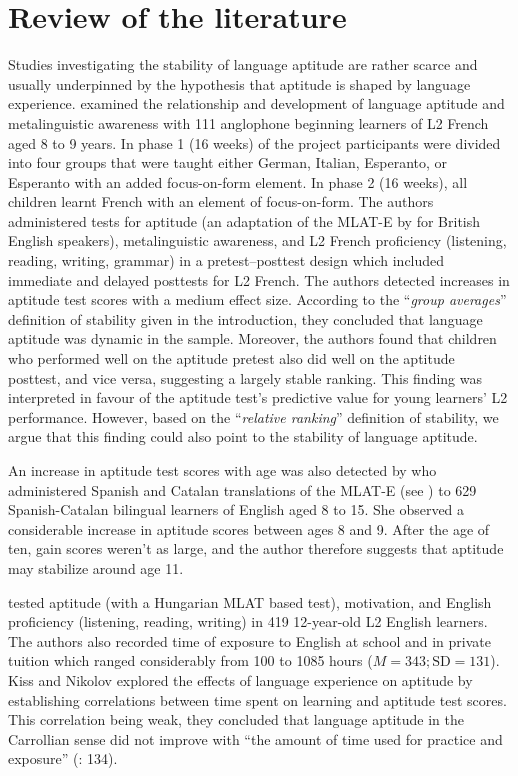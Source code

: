 \documentclass[output=paper]{langsci/langscibook}
\begin{document}
\section{Review of the literature} 

Studies investigating the stability of language aptitude are rather scarce and usually underpinned by the hypothesis that aptitude is shaped by language experience. \citet{RoehrBrackinTellier2019} examined the relationship and development of language aptitude and metalinguistic awareness with 111 anglophone beginning learners of L2 French aged 8 to 9 years. In phase 1 (16 weeks) of the project participants were divided into four groups that were taught either German, Italian, Esperanto, or Esperanto with an added focus-on-form element. In phase 2 (16 weeks), all children learnt French with an element of focus-on-form. The authors administered tests for aptitude (an adaptation of the MLAT-E by \citet{CarrollSapon1976} for British English speakers), metalinguistic awareness, and L2 French proficiency (listening, reading, writing, grammar) in a pretest--posttest design which included immediate and delayed posttests for L2 French. The authors detected increases in aptitude test scores with a medium effect size. According to the “\textit{group averages}” definition of stability given in the introduction, they concluded that language aptitude was dynamic in the sample. Moreover, the authors found that children who performed well on the aptitude pretest also did well on the aptitude posttest, and vice versa, suggesting a largely stable ranking. This finding was interpreted in favour of the aptitude test’s predictive value for young learners’ L2 performance. However, based on the “\textit{relative ranking}” definition of stability, we argue that this finding could also point to the stability of language aptitude.

An increase in aptitude test scores with age was also detected by \citet{SuarezVilagran2010} who administered Spanish and Catalan translations of the MLAT-E (see ) to 629 Spanish-Catalan bilingual learners of English aged 8 to 15. She observed a considerable increase in aptitude scores between ages 8 and 9. After the age of ten, gain scores weren’t as large, and the author therefore suggests that aptitude may stabilize around age 11.

\citet{KissNikolov2005} tested aptitude (with a Hungarian MLAT based test), motivation, and English proficiency (listening, reading, writing) in 419 12-year-old L2 English learners. The authors also recorded time of exposure to English at school and in private tuition which ranged considerably from 100 to 1085 hours ($M= 343; \text{SD}= 131$). Kiss and Nikolov explored the effects of language experience on aptitude by establishing correlations between time spent on learning and aptitude test scores. This correlation being weak, they concluded that language aptitude in the Carrollian sense did not improve with “the amount of time used for practice and exposure” (\citealt{KissNikolov2005}: 134).
\end{document}
